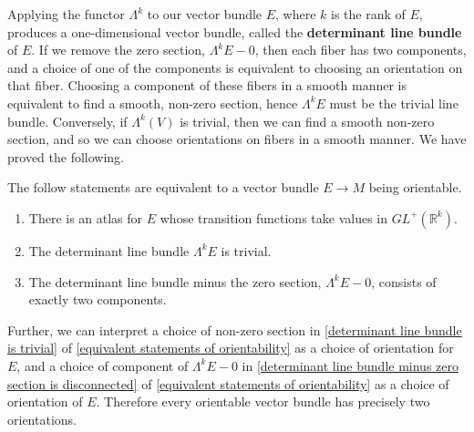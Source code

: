 Applying the functor $\Lambda^k$ to our vector bundle $E$, where $k$ is the rank of $E$, produces a one-dimensional vector bundle, called the \textbf{determinant line bundle} of $E$. If we remove the zero section, $\Lambda^k E - 0$, then each fiber has two components, and a choice of one of the components is equivalent to choosing an orientation on that fiber. Choosing a component of these fibers in a smooth manner is equivalent to find a smooth, non-zero section, hence $\Lambda^k E$ must be the trivial line bundle. Conversely, if $\Lambda^k(V)$ is trivial, then we can find a smooth non-zero section, and so we can choose orientations on fibers in a smooth manner. We have proved the following.
\begin{prop}
\label{equivalent statements of orientability}
The follow statements are equivalent to a vector bundle $E \rightarrow M$ being orientable.
\begin{enumerate}
	\item There is an atlas for $E$ whose transition functions take values in $GL^+(\mathbb R^k)$.
	\item The determinant line bundle $\Lambda^k E$ is trivial.
	\label{determinant line bundle is trivial}
	\item The determinant line bundle minus the zero section, $\Lambda^k E - 0$, consists of exactly two components.
	\label{determinant line bundle minus zero section is disconnected}
\end{enumerate}
\end{prop}
Further, we can interpret a choice of non-zero section in \ref{determinant line bundle is trivial} of \cref{equivalent statements of orientability} as a choice of orientation for $E$, and a choice of component of $\Lambda^k E-0$ in \ref{determinant line bundle minus zero section is disconnected} of \ref{equivalent statements of orientability} as a choice of orientation of $E$. Therefore every orientable vector bundle has precisely two orientations.

